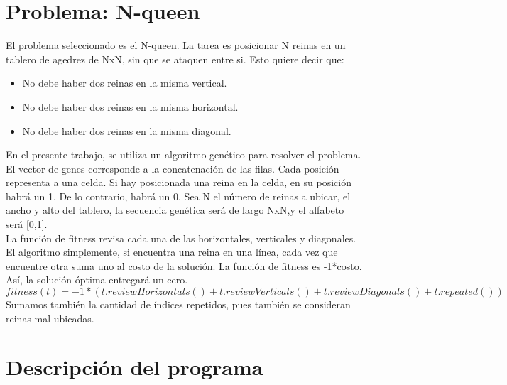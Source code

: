\documentclass[letterpaper,11pt]{article} %
\begin{document}








\section{Problema: N-queen}

El problema seleccionado es el N-queen. La tarea es posicionar N reinas en un tablero de agedrez de NxN, sin que se ataquen entre si. Esto quiere decir que:

\begin{itemize}
\item No debe haber dos reinas en la misma vertical.
\item No debe haber dos reinas en la misma horizontal.
\item No debe haber dos reinas en la misma diagonal.
\end{itemize}

En el presente trabajo, se utiliza un algoritmo genético para resolver el problema. \\

El vector de genes corresponde a la concatenación de las filas. Cada posición representa a una celda. Si hay posicionada una reina en la celda, en su posición habrá un 1. De lo contrario, habrá un 0. Sea N el número de reinas a ubicar, el ancho y alto del tablero, la secuencia genética será de largo NxN,y el alfabeto será [0,1].\\

La función de fitness revisa cada una de las horizontales, verticales y diagonales. El algoritmo simplemente, si encuentra una reina en una línea, cada vez que encuentre otra suma uno al costo de la solución. La función de fitness es -1*costo. Así, la solución óptima entregará un cero.\\

$fitness(t) = -1*(t.reviewHorizontals()+t.reviewVerticals()+t.reviewDiagonals()+t.repeated())$\\

Sumamos también la cantidad de índices repetidos, pues también se consideran reinas mal ubicadas.
  

\section{Descripción del programa}
\end{document}
